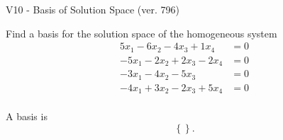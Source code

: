 \begin{exercise}
  \begin{exerciseTitle}V10 - Basis of Solution Space (ver. 796)\end{exerciseTitle}
  \begin{exerciseStatement}
    Find a basis for the solution space of the homogeneous system 
\begin{align*}
 5 x_ 1 -6 x_ 2 -4 x_ 3 + 1 x_ 4 &= 0  \\ 
  -5 x_ 1 -2 x_ 2 + 2 x_ 3 -2 x_ 4 &= 0  \\ 
  -3 x_ 1 -4 x_ 2 -5 x_ 3 &= 0  \\ 
  -4 x_ 1 + 3 x_ 2 -2 x_ 3 + 5 x_ 4 &= 0  \\ 
 \end{align*}


 
  \end{exerciseStatement}

  \begin{exerciseAnswer}
   A basis is   
\[\left\{\right\}.\]

  


  \end{exerciseAnswer}
\end{exercise}